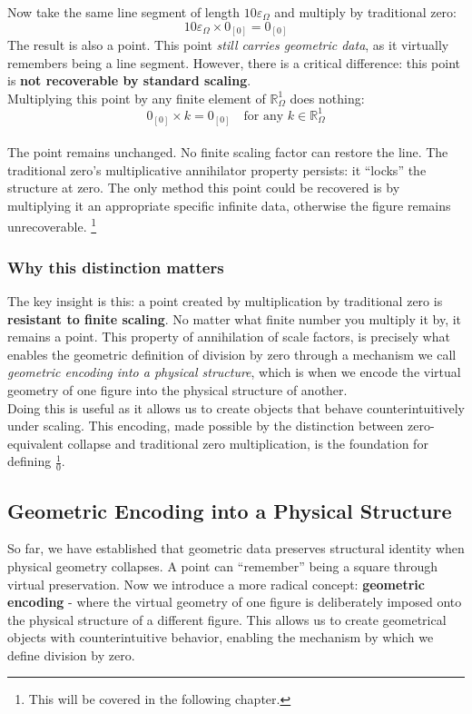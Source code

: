 \documentclass{article}
\begin{document}
Now take the same line segment of length $10\varepsilon_\Omega$ and multiply by traditional zero:
$$10\varepsilon_\Omega \times 0_{[0]} = 0_{[0]}$$The result is also a point. This point \textit{still carries geometric data}, as it virtually remembers being a line segment. However, there is a critical difference: this point is \textbf{not recoverable by standard scaling}.
\\Multiplying this point by any finite element of $\mathbb{R}_\Omega^1$ does nothing:
$$0_{[0]} \times k = 0_{[0]} \quad \text{for any } k \in \mathbb{R}_\Omega^1$$
\\The point remains unchanged. No finite scaling factor can restore the line. The traditional zero's multiplicative annihilator property persists: it ``locks'' the structure at zero. The only method this point could be recovered is by multiplying it an appropriate specific infinite data, otherwise the figure remains unrecoverable. \footnote{This will be covered in the following chapter.}

\subsubsection*{Why this distinction matters}

The key insight is this: a point created by multiplication by traditional zero is \textbf{resistant to finite scaling}. No matter what finite number you multiply it by, it remains a point. This property of annihilation of scale factors, is precisely what enables the geometric definition of division by zero through a mechanism we call \textit{geometric encoding into a physical structure}, which is when we encode the virtual geometry of one figure into the physical structure of another.
\\Doing this is useful as it allows us to create objects that behave counterintuitively under scaling. This encoding, made possible by the distinction between zero-equivalent collapse and traditional zero multiplication, is the foundation for defining $\frac{1}{0}$.

\subsection{Geometric Encoding into a Physical Structure}

So far, we have established that geometric data preserves structural identity when physical geometry collapses. A point can ``remember'' being a square through virtual preservation. Now we introduce a more radical concept: \textbf{geometric encoding} - where the virtual geometry of one figure is deliberately imposed onto the physical structure of a different figure. This allows us to create geometrical objects with counterintuitive behavior, enabling the mechanism by which we define division by zero.
\end{document}
